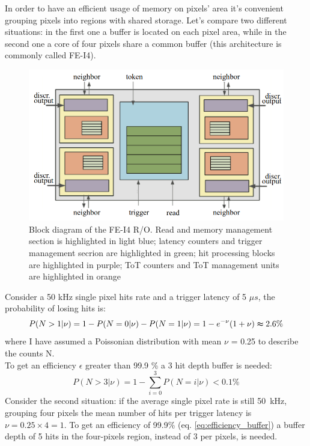    In order to have an efficient usage of memory on pixels' area it's convenient grouping pixels into regions with shared storage. Let's compare two different situations: in the first one a buffer is located on each pixel area, while in the second one a core of four pixels share a common buffer (this architecture is commonly called FE-I4). \\
   \begin{figure}[h!]
      \centering
      \includegraphics[width=.7\linewidth]{figures/Pixel_detectors/core.png}
      \caption{Block diagram of the FE-I4 R/O. Read and memory
      management section is highlighted in light blue; latency counters and
      trigger management secrion are highlighted in green; hit processing blocks
      are highlighted in purple; ToT counters and ToT management units are
      highlighted in orange}
      \label{fig:core}
   \end{figure}
   Consider a 50 kHz single pixel hits rate and a trigger latency of 5 $\mu s$, the probability of losing hits is: 
   \begin{equation}
      P(N > 1 | \nu) = 1-P(N = 0 | \nu) - P(N = 1 | \nu) = 1 - e^{-\nu} (1+\nu) \thickapprox 2.6 \% 
   \end{equation}    
   where I have assumed a Poissonian distribution with mean $\nu$ = 0.25 to describe the counts N.\\
   To get an efficiency $\epsilon$ greater than 99.9 \% a 3 hit depth buffer is needed: 
   \begin{equation}
      P(N > 3 | \nu) = 1-\sum_{i=0}^{3} P(N = i | \nu) < 0.1\%  
   \label{eq:efficiency_buffer}
   \end{equation} 
   Consider the second situation: if the average single pixel rate is still \SI{50}{kHz}, grouping four pixels the mean number of hits per trigger latency is $\nu = 0.25 \times 4 = 1$. To get an efficiency of 99.9\% (eq. \ref{eq:efficiency_buffer}) a buffer depth of 5 hits in the four-pixels region, instead of 3 per pixels, is needed. 

